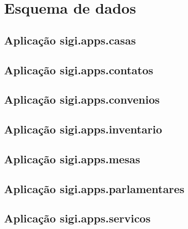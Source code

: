 %
%

\section{Esquema de dados}
\label{sec:esquema}

\subsection{Aplicação sigi.apps.casas}


\subsection{Aplicação sigi.apps.contatos}


\subsection{Aplicação sigi.apps.convenios}


\subsection{Aplicação sigi.apps.inventario}


\subsection{Aplicação sigi.apps.mesas}


\subsection{Aplicação sigi.apps.parlamentares}


\subsection{Aplicação sigi.apps.servicos}


%
%
